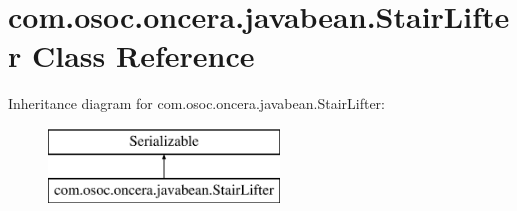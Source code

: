\hypertarget{classcom_1_1osoc_1_1oncera_1_1javabean_1_1_stair_lifter}{}\section{com.\+osoc.\+oncera.\+javabean.\+Stair\+Lifter Class Reference}
\label{classcom_1_1osoc_1_1oncera_1_1javabean_1_1_stair_lifter}
Inheritance diagram for com.\+osoc.\+oncera.\+javabean.\+Stair\+Lifter\+:\begin{figure}[H]
\begin{center}
\leavevmode
\includegraphics[height=2.000000cm]{classcom_1_1osoc_1_1oncera_1_1javabean_1_1_stair_lifter}
\end{center}
\end{figure}
